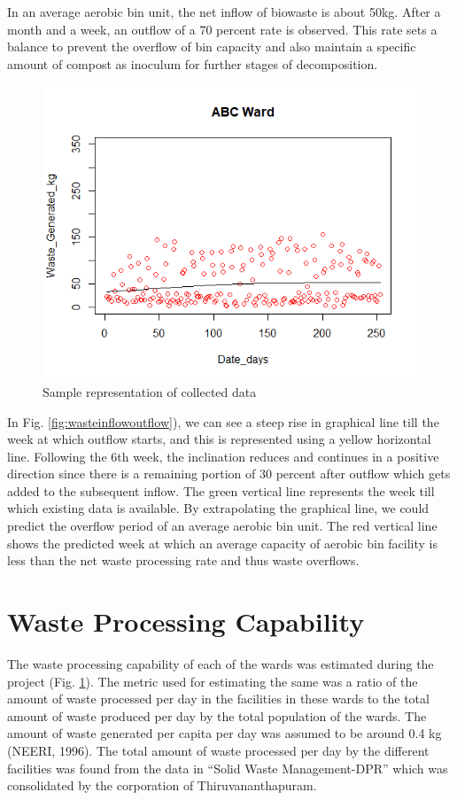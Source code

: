 \documentclass[12pt,a4paper]{report}
\begin{document}
In an average aerobic bin unit, the net inflow of biowaste is about 50kg. After a month and a week, an outflow of a 70 percent rate is observed. This rate sets a balance to prevent the overflow of bin capacity and also maintain a specific amount of compost as inoculum for further stages of decomposition. 

\begin{figure}[H]
	\centering
	\includegraphics[width=0.7\linewidth]{abc_ward}
	\caption{Sample representation of collected data}
	\label{fig:abcward}
\end{figure}

In Fig. \ref{fig:wasteinflowoutflow}), we can see a steep rise in graphical line till the week at which outflow starts, and this is represented using a yellow horizontal line. Following the 6th week, the inclination reduces and continues in a positive direction since there is a remaining portion of 30 percent after outflow which gets added to the subsequent inflow. The green vertical line represents the week till which existing data is available. By extrapolating the graphical line, we could predict the overflow period of an average aerobic bin unit. The red vertical line shows the predicted week at which an average capacity of aerobic bin facility is less than the net waste processing rate and thus waste overflows.



\section{Waste Processing Capability}

The waste processing capability of each of the wards was estimated during the project (Fig. \ref{fig:abcward}). The metric used for estimating the same was a ratio of the amount of waste processed per day in the facilities in these wards to the total amount of waste produced per day by the total population of the wards. The amount of waste generated per capita per day was assumed to be around 0.4 kg (NEERI, 1996).
The total amount of waste processed per day by the different facilities was found from the data in “Solid Waste Management-DPR” which was consolidated by the corporation of Thiruvananthapuram.
\end{document}
